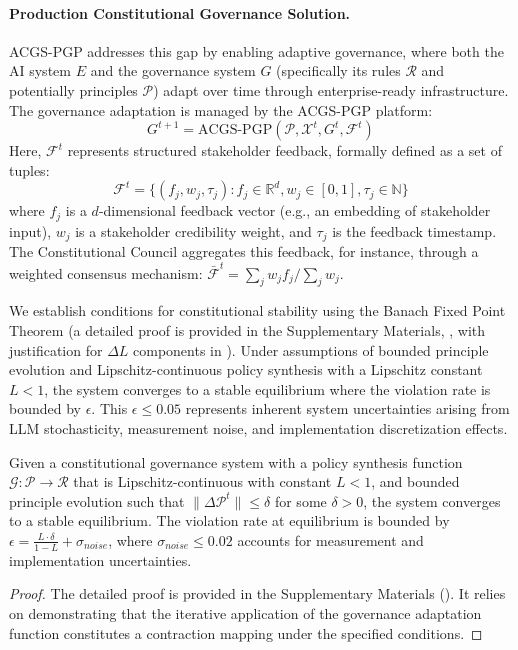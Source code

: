 \documentclass[manuscript,screen,9pt]{acmart}
\begin{document}
\paragraph{Production Constitutional Governance Solution.} ACGS-PGP addresses this gap by enabling adaptive governance, where both the AI system $E$ and the governance system $G$ (specifically its rules $\mathcal{R}$ and potentially principles $\mathcal{P}$) adapt over time through enterprise-ready infrastructure. The governance adaptation is managed by the ACGS-PGP platform:
\[G^{t+1} = \text{ACGS-PGP}(\mathcal{P}, \mathcal{X}^t, G^t, \mathcal{F}^t)\]
Here, $\mathcal{F}^t$ represents structured stakeholder feedback, formally defined as a set of tuples:
\[\mathcal{F}^t = \{(f_j, w_j, \tau_j) : f_j \in \mathbb{R}^d, w_j \in [0,1], \tau_j \in \mathbb{N}\}\]
where $f_j$ is a $d$-dimensional feedback vector (e.g., an embedding of stakeholder input), $w_j$ is a stakeholder credibility weight, and $\tau_j$ is the feedback timestamp. The Constitutional Council aggregates this feedback, for instance, through a weighted consensus mechanism: $\bar{\mathcal{F}}^t = \sum_{j} w_j f_j / \sum_{j} w_j$.

We establish conditions for constitutional stability using the Banach Fixed Point Theorem (a detailed proof is provided in the Supplementary Materials, , with justification for $\Delta L$ components in ). Under assumptions of bounded principle evolution and Lipschitz-continuous policy synthesis with a Lipschitz constant $L < 1$, the system converges to a stable equilibrium where the violation rate is bounded by $\epsilon$. This $\epsilon \leq 0.05$ represents inherent system uncertainties arising from LLM stochasticity, measurement noise, and implementation discretization effects.

\begin{theorem}
\label{thm:constitutional_stability}
Given a constitutional governance system with a policy synthesis function $\mathcal{G}: \mathcal{P} \rightarrow \mathcal{R}$ that is Lipschitz-continuous with constant $L < 1$, and bounded principle evolution such that $\|\Delta \mathcal{P}^t\| \leq \delta$ for some $\delta > 0$, the system converges to a stable equilibrium. The violation rate at equilibrium is bounded by $\epsilon = \frac{L \cdot \delta}{1-L} + \sigma_{noise}$, where $\sigma_{noise} \leq 0.02$ accounts for measurement and implementation uncertainties.
\end{theorem}
\begin{proof}
The detailed proof is provided in the Supplementary Materials (). It relies on demonstrating that the iterative application of the governance adaptation function constitutes a contraction mapping under the specified conditions.
\end{proof}
\end{document}
